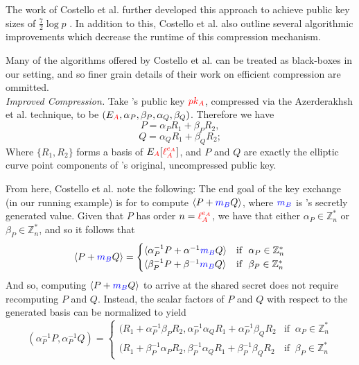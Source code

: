 The work of Costello et al. further developed this approach to achieve public key sizes of $\frac{7}{2}\log p$ \cite{pkcomp}. In addition to this, Costello et al. also outline several algorithmic improvements which decrease the runtime of this compression mechanism.

Many of the algorithms offered by Costello et al. can be treated as black-boxes in our setting, and so finer grain details of their work on efficient compression are ommitted.\\

\noindent
\textit{Improved Compression.} Take \alice's public key $\textcolor{red}{pk_A}$, compressed via the Azerderakhsh et al. technique, to be $(E_{\textcolor{red}{A}}, \alpha_{P}, \beta_{P}, \alpha_{Q}, \beta_{Q})$. Therefore we have
$$
P = \alpha_{P}R_1 + \beta_{P}R_2,
$$
$$
Q = \alpha_{Q}R_1 + \beta_{Q}R_2;
$$
Where $\{R_1, R_2\}$ forms a basis of $E_{\textcolor{red}{A}}[\textcolor{red}{\ell_{A}^{e_A}}]$, and $P$ and $Q$ are exactly the elliptic curve point components of \alice's original, uncompressed public key.

From here, Costello et al. note the following: The end goal of the key exchange (in our running example) is for \bob to compute $\langle P + \textcolor{blue}{m_B} Q\rangle$, where $\textcolor{blue}{m_B}$ is \bob's secretly generated value. Given that $P$ has order $n = \textcolor{red}{\ell_{A}^{e_A}}$, we have that either $\alpha_{P} \in \mathbb{Z}^{*}_{n}$ or $\beta_{P} \in \mathbb{Z}^{*}_{n}$, and so it follows that
$$
\langle P + \textcolor{blue}{m_B} Q \rangle =  \begin{cases}
							\langle \alpha^{-1}_{P}P + \alpha^{-1}\textcolor{blue}{m_B} Q \rangle & \text{if }\ \alpha_{P} \in \mathbb{Z}^{*}_{n}\\
							\langle \beta^{-1}_{P}P + \beta^{-1}\textcolor{blue}{m_B} Q \rangle & \text{if }\ \beta_{P} \in \mathbb{Z}^{*}_{n}
							\end{cases}
$$
And so, computing $\langle P + \textcolor{blue}{m_B} Q\rangle$ to arrive at the shared secret does not require recomputing $P$ and $Q$. Instead, the scalar factors of $P$ and $Q$ with respect to the generated basis can be normalized to yield
$$
(\alpha^{-1}_{P}P, \alpha^{-1}_{P}Q) = \begin{cases}
							(R_{1} + \alpha^{-1}_{P}\beta_{P} R_{2}, \alpha^{-1}_{P}\alpha_{Q}R_{1} + \alpha^{-1}_{P}\beta_{Q}R_{2}  & \text{if }\ \alpha_{P} \in \mathbb{Z}^{*}_{n}\\
							(R_{1} + \beta^{-1}_{P}\alpha_{P} R_{2}, \beta^{-1}_{P}\alpha_{Q}R_{1} + \beta^{-1}_{P}\beta_{Q}R_{2} & \text{if }\ \beta_{P} \in \mathbb{Z}^{*}_{n}
						   	\end{cases}
$$

